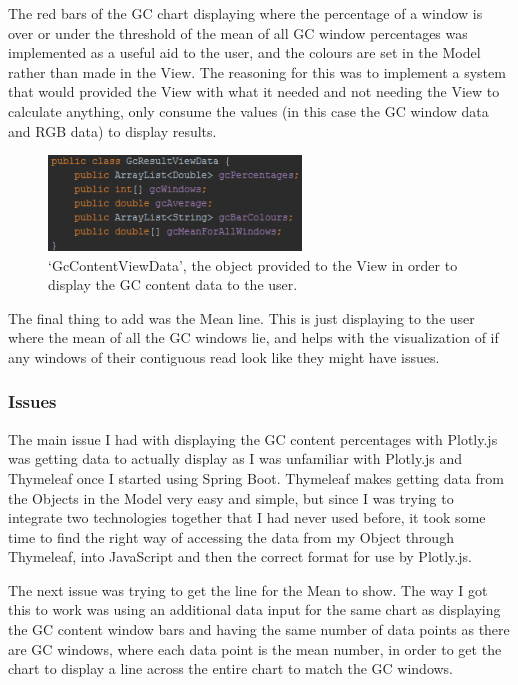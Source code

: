 The red bars of the GC chart displaying where the percentage of a window is over or under the threshold of the mean of all GC window percentages was implemented as a useful aid to the user, and the colours are set in the Model rather than made in the View. The reasoning for this was to implement a system that would provided the View with what it needed and not needing the View to calculate anything, only consume the values (in this case the GC window data and RGB data) to display results.

\begin{figure}[H]
\centering
\includegraphics[width=0.6\textwidth]{images/gcviewdata}
\caption{`GcContentViewData', the object provided to the View in order to display the GC content data to the user.}
\end{figure}

The final thing to add was the Mean line. This is just displaying to the user where the mean of all the GC windows lie, and helps with the visualization of if any windows of their contiguous read look like they might have issues.
\subsubsection{Issues}
The main issue I had with displaying the GC content percentages with Plotly.js was getting data to actually display as I was unfamiliar with Plotly.js and Thymeleaf once I started using Spring Boot. Thymeleaf makes getting data from the Objects in the Model very easy and simple, but since I was trying to integrate two technologies together that I had never used before, it took some time to find the right way of accessing the data from my Object through Thymeleaf, into JavaScript and then the correct format for use by Plotly.js.

The next issue was trying to get the line for the Mean to show. The way I got this to work was using an additional data input for the same chart as displaying the GC content window bars and having the same number of data points as there are GC windows, where each data point is the mean number, in order to get the chart to display a line across the entire chart to match the GC windows.

